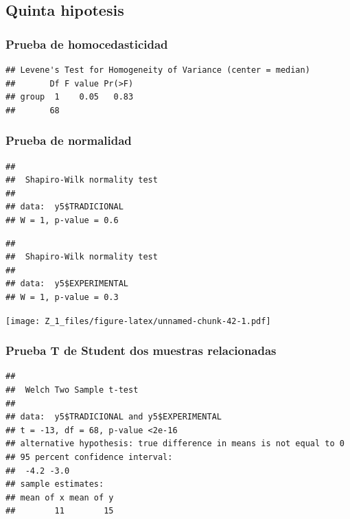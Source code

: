 \documentclass[12pt,]{report}
\begin{document}
\hypertarget{quinta-hipotesis}{%
\subsection{Quinta hipotesis}\label{quinta-hipotesis}}

\hypertarget{prueba-de-homocedasticidad-4}{%
\subsubsection{Prueba de homocedasticidad}\label{prueba-de-homocedasticidad-4}}

\begin{verbatim}
## Levene's Test for Homogeneity of Variance (center = median)
##       Df F value Pr(>F)
## group  1    0.05   0.83
##       68
\end{verbatim}

\hypertarget{prueba-de-normalidad-4}{%
\subsubsection{Prueba de normalidad}\label{prueba-de-normalidad-4}}

\begin{verbatim}
## 
##  Shapiro-Wilk normality test
## 
## data:  y5$TRADICIONAL
## W = 1, p-value = 0.6
\end{verbatim}

\begin{verbatim}
## 
##  Shapiro-Wilk normality test
## 
## data:  y5$EXPERIMENTAL
## W = 1, p-value = 0.3
\end{verbatim}

\texttt{[image: Z\_1\_files/figure-latex/unnamed-chunk-42-1.pdf]}

\hypertarget{prueba-t-de-student-dos-muestras-relacionadas-4}{%
\subsubsection{Prueba T de Student dos muestras relacionadas}\label{prueba-t-de-student-dos-muestras-relacionadas-4}}

\begin{verbatim}
## 
##  Welch Two Sample t-test
## 
## data:  y5$TRADICIONAL and y5$EXPERIMENTAL
## t = -13, df = 68, p-value <2e-16
## alternative hypothesis: true difference in means is not equal to 0
## 95 percent confidence interval:
##  -4.2 -3.0
## sample estimates:
## mean of x mean of y 
##        11        15
\end{verbatim}
\end{document}

